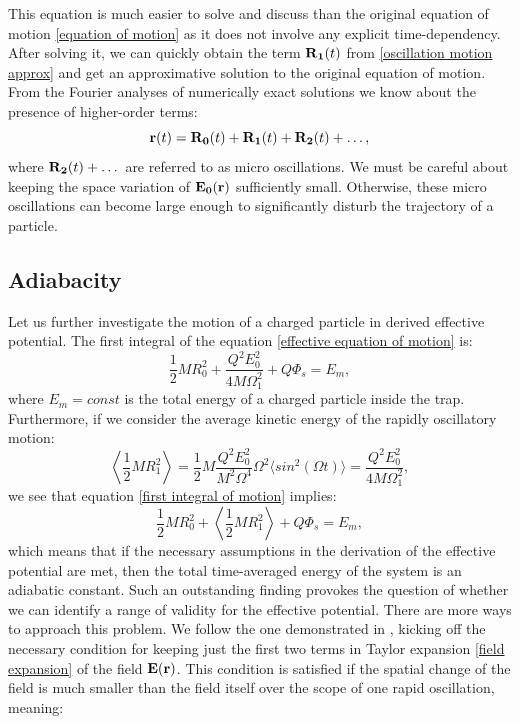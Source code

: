 This equation is much easier to solve and discuss than the original equation of motion \eqref{equation of motion} as it does not involve any explicit time-dependency. After solving it, we can quickly obtain the term $\vb{R_1}(t)$ from \eqref{oscillation motion approx} and get an approximative solution to the original equation of motion. From the Fourier analyses of numerically exact solutions \cite{gerlich1992inhomogeneous} we know about the presence of higher-order terms: $$\vb{r}(t) = \vb{R_0}(t) + \vb{R_1}(t) + \vb{R_2}(t) + \dots,$$ where $\vb{R_2}(t) + \dots$ are referred to as micro oscillations. We must be careful about keeping the space variation of $\vb{E_0}(\vb{r})$ sufficiently small. Otherwise, these micro oscillations can become large enough to significantly disturb the trajectory of a particle.

\subsection{Adiabacity}
Let us further investigate the motion of a charged particle in derived effective potential. The first integral of the equation \eqref{effective equation of motion} is:
\begin{equation}
	\label{first integral of motion}
	\dfrac{1}{2}M R_0^2 + \dfrac{Q^2 E_0^2}{4 M \Omega_1^2} + Q\Phi_s = E_m,
\end{equation}
where $E_m = const$ is the total energy of a charged particle inside the trap. Furthermore, if we consider the average kinetic energy of the rapidly oscillatory motion:
\begin{equation}
	\left\langle \dfrac{1}{2} M R_1^2 \right\rangle = \dfrac{1}{2}M \dfrac{Q^2 E_0^2}{M^2 \Omega^4}\Omega^2 \langle sin^2(\Omega t) \rangle = \dfrac{Q^2 E_0^2}{4 M \Omega_1^2},
\end{equation}
we see that equation \eqref{first integral of motion} implies:
\begin{equation}
	\label{adiabatic constant}
	\dfrac{1}{2}M R_0^2 + \left\langle \dfrac{1}{2} M R_1^2 \right\rangle + Q\Phi_s = E_m,
\end{equation}
which means that if the necessary assumptions in the derivation of the effective potential are met, then the total time-averaged energy of the system is an adiabatic constant. Such an outstanding finding provokes the question of whether we can identify a range of validity for the effective potential. There are more ways to approach this problem. We follow the one demonstrated in \cite{gerlich1992inhomogeneous}, kicking off the necessary condition for keeping just the first two terms in Taylor expansion \eqref{field expansion} of the field $\vb{E}(\vb{r})$. This condition is satisfied if the spatial change of the field is much smaller than the field itself over the scope of one rapid oscillation, meaning:

